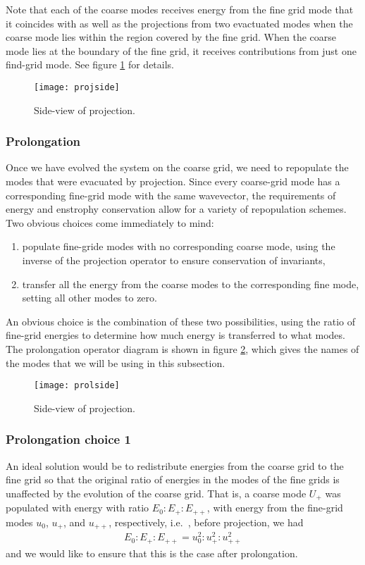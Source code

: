 \documentclass[10pt,showpacs,showkeys,%
amsfonts,amsmath,
onecolumn,
floatfix,aps,superscriptaddress]{revtex4}
\begin{document}
Note that each of the coarse modes receives energy from the
fine grid mode that it coincides with as well as the projections
from two evactuated modes when the coarse mode lies within the region
covered by the fine grid. When the coarse mode lies at the boundary of
the fine grid, it receives contributions from just one find-grid mode.
See figure \ref{projside} for details.

\begin{figure}[htb]
  \begin{center}
    \texttt{[image: projside]}
    \caption{Side-view of projection.}
    \label{projside}
  \end{center}
\end{figure}

\subsubsection{Prolongation}
Once we have evolved the system on the coarse grid, 
we need to repopulate the modes that were evacuated by projection.
Since every coarse-grid mode has a corresponding fine-grid mode with
the same wavevector, the requirements of energy and enstrophy conservation
allow for a variety of repopulation schemes. 
Two obvious choices come immediately to mind:
\begin{enumerate}
\item
populate fine-gride modes with no corresponding coarse mode, using the inverse
of the projection operator to ensure conservation of invariants, 
\item
transfer all the energy from the coarse modes to the corresponding fine 
mode, setting all other modes to zero.
\end{enumerate}
An obvious choice is the combination of these two possibilities, using 
the ratio of fine-grid energies to determine how much energy is transferred
to what modes. The prolongation operator diagram is shown in figure 
\ref{prolside}, which gives the names of the modes that we will be using
in this subsection.
\begin{figure}[htb]
  \begin{center}
    \texttt{[image: prolside]}
    \caption{Side-view of projection.}
    \label{prolside}
  \end{center}
\end{figure}

\subsubsection{Prolongation choice 1}
An ideal solution would be to redistribute energies from the coarse grid
to the fine grid so that the original ratio of energies in the modes
of the fine grids is unaffected by the evolution of the coarse grid.
That is, a coarse mode $U_+$ was populated with energy with ratio 
$E_0:E_+:E_{++}$, with energy from the fine-grid modes $u_0$, $u_+$, 
and $u_{++}$, respectively, i.e.\ , before projection, we had
\begin{eqnarray}
  E_0:E_+:E_{++} = u_0^2: u_+^2: u_{++}^2
\end{eqnarray}
and we would like to ensure that this is the case after prolongation. 
\end{document}
